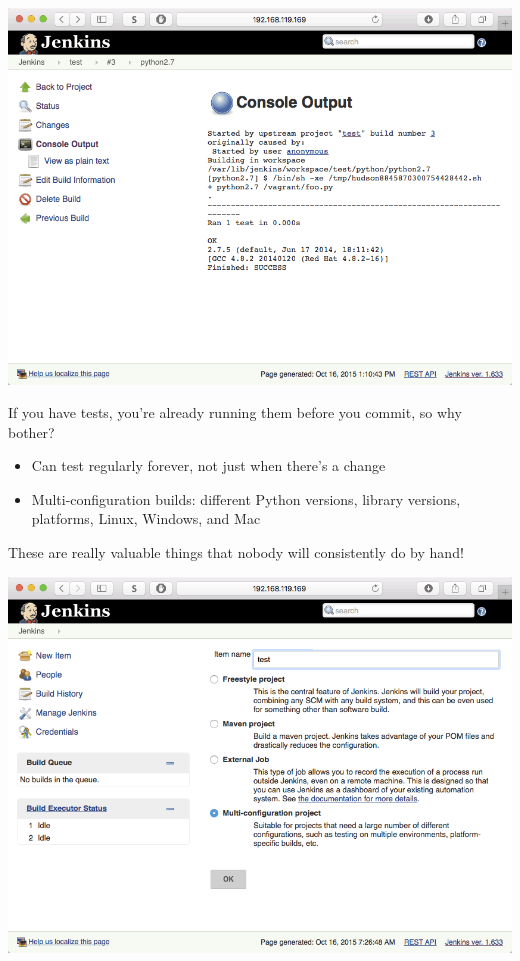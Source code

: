 \documentclass[xcolor=svgnames,17pt]{beamer}
\begin{document}
\begin{frame}[plain]{}
\includegraphics[width=\paperwidth,frame,center]{hello-6-output-1.png}
\end{frame}

\begin{frame}{}
If you have tests, you’re already running them before you commit, so why
bother?
\pause
\begin{itemize}
\item Can test regularly forever, not just when there’s a change
\pause
\item Multi-configuration builds: different Python versions, library
versions, platforms, Linux, Windows, and Mac
\end{itemize}
\pause
\alert{These are really valuable things that nobody will consistently do by
hand!}
\end{frame}

\begin{frame}[plain]{}
\includegraphics[width=\paperwidth,frame,center]{hello-4-multi-config.png}
\end{frame}
\end{document}
